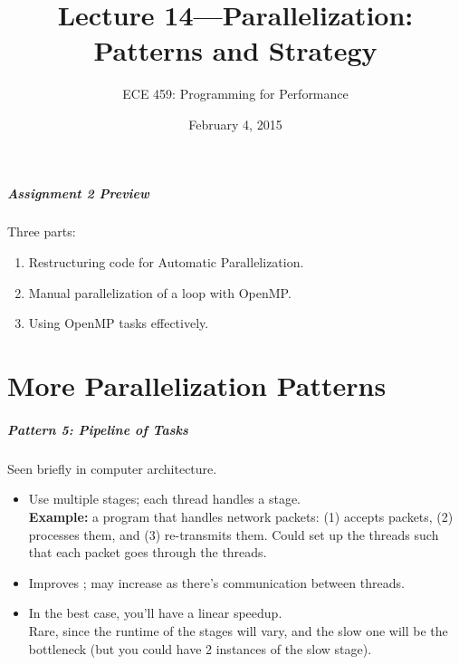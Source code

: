 \documentclass[aspectratio=43]{beamer}
\title{Lecture 14---Parallelization: Patterns and Strategy}
\subtitle{ECE 459: Programming for Performance}
\date{February 4, 2015}
\newenvironment{changemargin}[1]{%
  \begin{list}{}{%
    \setlength{\topsep}{0pt}%
    \setlength{\leftmargin}{#1}%
    \setlength{\rightmargin}{1em}
    \setlength{\listparindent}{\parindent}%
    \setlength{\itemindent}{\parindent}%
    \setlength{\parsep}{\parskip}%
  }%
  \item[]}{\end{list}}
\begin{document}
\begin{frame}[plain]
  \titlepage
\end{frame}


\begin{frame}
  \frametitle{Assignment 2 Preview}

\large
  \begin{changemargin}{1.5cm}
  Three parts:
  \begin{enumerate}
    \item Restructuring code for Automatic Parallelization.
    \item Manual parallelization of a loop with OpenMP.
    \item Using OpenMP tasks effectively.
  \end{enumerate}

  \end{changemargin}
\end{frame}

\part{More Parallelization Patterns}
\frame{\partpage}

\begin{frame}
  \frametitle{Pattern 5: Pipeline of Tasks}

  \begin{changemargin}{2.5cm}
    Seen briefly in computer architecture.

    \begin{itemize}
    \item Use multiple stages; each thread handles a stage.\\[1em]
     {\bf Example:} a program that handles network packets: (1) accepts
      packets, (2) processes them, and (3) re-transmits them. Could set up the threads such that each packet goes through the threads.
    \vfill
    \item Improves ; may increase  as
      there's communication between threads.
    \vfill
    \item In the best case, you'll have a linear speedup.\\[1em]

     Rare, since the runtime of the stages will vary, and the slow
      one will be the bottleneck (but you could have 2 instances of the
      slow stage).
  \end{itemize}
  \end{changemargin}
\end{frame}
\end{document}
